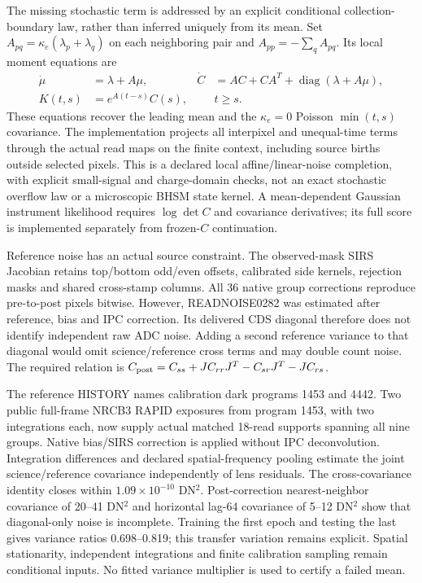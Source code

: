 The missing stochastic term is addressed by an explicit conditional
collection-boundary law, rather than inferred uniquely from its mean.
Set $A_{pq}=\kappa_e(\lambda_p+\lambda_q)$ on each neighboring pair and
$A_{pp}=-\sum_q A_{pq}$. Its local moment equations are
\begin{align}
 \dot\mu&=\lambda+A\mu, &
 \dot C&=AC+CA^T+\operatorname{diag}(\lambda+A\mu),\nonumber\\
 K(t,s)&=e^{A(t-s)}C(s), && t\geq s .
 \label{eq:he0435-conditional-counting-covariance}
\end{align}
These equations recover the leading mean and the $\kappa_e=0$
Poisson $\min(t,s)$ covariance. The implementation projects all
interpixel and unequal-time terms through the actual read maps on the
finite context, including source births outside selected pixels.
This is a declared local affine/linear-noise completion, with explicit
small-signal and charge-domain checks, not an exact stochastic overflow
law or a microscopic BHSM state kernel. A mean-dependent Gaussian
instrument likelihood requires $\log\det C$ and covariance derivatives;
its full score is implemented separately from frozen-$C$ continuation.

Reference noise has an actual source constraint. The observed-mask SIRS
Jacobian retains top/bottom odd/even offsets, calibrated side kernels,
rejection masks and shared cross-stamp columns. All 36 native group
corrections reproduce pre-to-post pixels bitwise. However, READNOISE0282
was estimated after reference, bias and IPC correction. Its delivered
CDS diagonal therefore does not identify independent raw ADC noise.
Adding a second reference variance to that diagonal would omit
science/reference cross terms and may double count noise. The required
relation is $C_{\rm post}=C_{ss}+JC_{rr}J^T-C_{sr}J^T-JC_{rs}$.

The reference HISTORY names calibration dark programs 1453 and 4442.
Two public full-frame NRCB3 RAPID exposures from program 1453, with two
integrations each, now supply actual matched 18-read supports spanning
all nine groups. Native bias/SIRS correction is applied without IPC
deconvolution. Integration differences and declared spatial-frequency
pooling estimate the joint science/reference covariance independently
of lens residuals. The cross-covariance identity closes within
$1.09\times10^{-10}$ DN$^2$. Post-correction nearest-neighbor covariance
of 20--41 DN$^2$ and horizontal lag-64 covariance of 5--12 DN$^2$ show
that diagonal-only noise is incomplete. Training the first epoch and
testing the last gives variance ratios 0.698--0.819; this transfer
variation remains explicit. Spatial stationarity, independent
integrations and finite calibration sampling remain conditional inputs.
No fitted variance multiplier is used to certify a failed mean.

